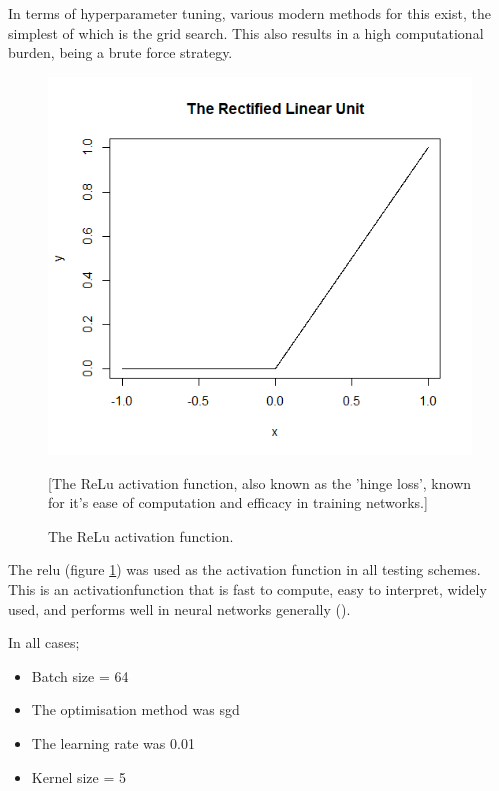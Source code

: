 In terms of \gls{hyperparameter} tuning, various modern methods for this exist, the simplest of which is the grid search. This also results in a high computational burden, being a brute force strategy. 
\bigskip

\begin{figure}
    \centering
    \includegraphics[scale=0.5]{figs/relu.png}
    \caption{The ReLu activation function.}[The ReLu activation function, also known as the 'hinge loss', known for it's ease of computation and efficacy in training networks.]
    \label{fig:relu_function}
\end{figure}

The \gls{relu} (figure \ref{fig:relu_function}) was used as the activation function in all testing schemes. This is an \gls{activationfunction} that is fast to compute, easy to interpret, widely used, and performs well in neural networks generally (\cite{activation_search}). 
\bigskip

In all cases;

\begin{itemize}
    \itemsep-1em 
    \item Batch size = 64
    \item The optimisation method was \gls{sgd}
    \item The learning rate was 0.01
    \item Kernel size = 5
\end{itemize}

